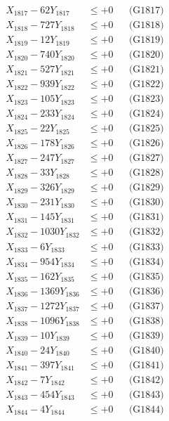 \documentclass[a4paper,10pt]{article}
\begin{document}
{\begin{align}
X_{1817} - 62Y_{1817} &\leq +0 && \text{(G1817)} \\
X_{1818} - 727Y_{1818} &\leq +0 && \text{(G1818)} \\
X_{1819} - 12Y_{1819} &\leq +0 && \text{(G1819)} \\
X_{1820} - 740Y_{1820} &\leq +0 && \text{(G1820)} \\
\allowbreak
X_{1821} - 527Y_{1821} &\leq +0 && \text{(G1821)} \\
X_{1822} - 939Y_{1822} &\leq +0 && \text{(G1822)} \\
X_{1823} - 105Y_{1823} &\leq +0 && \text{(G1823)} \\
X_{1824} - 233Y_{1824} &\leq +0 && \text{(G1824)} \\
X_{1825} - 22Y_{1825} &\leq +0 && \text{(G1825)} \\
X_{1826} - 178Y_{1826} &\leq +0 && \text{(G1826)} \\
X_{1827} - 247Y_{1827} &\leq +0 && \text{(G1827)} \\
X_{1828} - 33Y_{1828} &\leq +0 && \text{(G1828)} \\
X_{1829} - 326Y_{1829} &\leq +0 && \text{(G1829)} \\
X_{1830} - 231Y_{1830} &\leq +0 && \text{(G1830)} \\
\allowbreak
X_{1831} - 145Y_{1831} &\leq +0 && \text{(G1831)} \\
X_{1832} - 1030Y_{1832} &\leq +0 && \text{(G1832)} \\
X_{1833} - 6Y_{1833} &\leq +0 && \text{(G1833)} \\
X_{1834} - 954Y_{1834} &\leq +0 && \text{(G1834)} \\
X_{1835} - 162Y_{1835} &\leq +0 && \text{(G1835)} \\
X_{1836} - 1369Y_{1836} &\leq +0 && \text{(G1836)} \\
X_{1837} - 1272Y_{1837} &\leq +0 && \text{(G1837)} \\
X_{1838} - 1096Y_{1838} &\leq +0 && \text{(G1838)} \\
X_{1839} - 10Y_{1839} &\leq +0 && \text{(G1839)} \\
X_{1840} - 24Y_{1840} &\leq +0 && \text{(G1840)} \\
\allowbreak
X_{1841} - 397Y_{1841} &\leq +0 && \text{(G1841)} \\
X_{1842} - 7Y_{1842} &\leq +0 && \text{(G1842)} \\
X_{1843} - 454Y_{1843} &\leq +0 && \text{(G1843)} \\
X_{1844} - 4Y_{1844} &\leq +0 && \text{(G1844)} \\

\end{align}}
\end{document}
